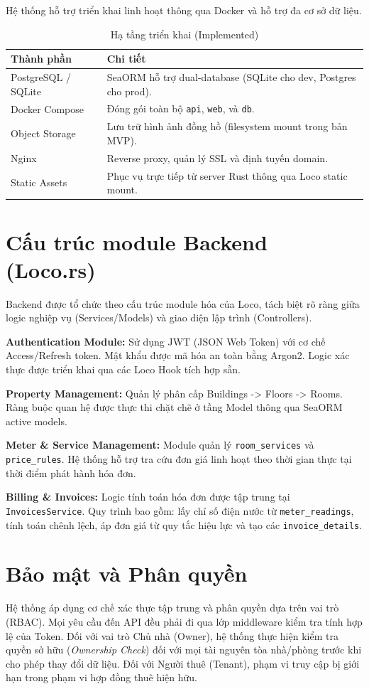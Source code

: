 Hệ thống hỗ trợ triển khai linh hoạt thông qua Docker và hỗ trợ đa cơ sở dữ liệu.

\begin{table}[htbp]
\centering
\caption{Hạ tầng triển khai (Implemented)}
\label{tab:infra}
\begin{tabularx}{\textwidth}{lX}
\toprule
\textbf{Thành phần} & \textbf{Chi tiết} \\
\midrule
PostgreSQL / SQLite & SeaORM hỗ trợ dual-database (SQLite cho dev, Postgres cho prod). \\
Docker Compose & Đóng gói toàn bộ \texttt{api}, \texttt{web}, và \texttt{db}. \\
Object Storage & Lưu trữ hình ảnh đồng hồ (filesystem mount trong bản MVP). \\
Nginx & Reverse proxy, quản lý SSL và định tuyến domain. \\
Static Assets & Phục vụ trực tiếp từ server Rust thông qua Loco static mount. \\
\bottomrule
\end{tabularx}
\end{table}

\section{Cấu trúc module Backend (Loco.rs)}

Backend được tổ chức theo cấu trúc module hóa của Loco, tách biệt rõ ràng giữa logic nghiệp vụ (Services/Models) và giao diện lập trình (Controllers).

\textbf{Authentication Module:} Sử dụng JWT (JSON Web Token) với cơ chế Access/Refresh token. Mật khẩu được mã hóa an toàn bằng Argon2. Logic xác thực được triển khai qua các Loco Hook tích hợp sẵn.

\textbf{Property Management:} Quản lý phân cấp Buildings -> Floors -> Rooms. Ràng buộc quan hệ được thực thi chặt chẽ ở tầng Model thông qua SeaORM active models.

\textbf{Meter \& Service Management:} Module quản lý \texttt{room\_services} và \texttt{price\_rules}. Hệ thống hỗ trợ tra cứu đơn giá linh hoạt theo thời gian thực tại thời điểm phát hành hóa đơn.

\textbf{Billing \& Invoices:} Logic tính toán hóa đơn được tập trung tại \texttt{InvoicesService}. Quy trình bao gồm: lấy chỉ số điện nước từ \texttt{meter\_readings}, tính toán chênh lệch, áp đơn giá từ quy tắc hiệu lực và tạo các \texttt{invoice\_details}.

\section{Bảo mật và Phân quyền}

Hệ thống áp dụng cơ chế xác thực tập trung và phân quyền dựa trên vai trò (RBAC). Mọi yêu cầu đến API đều phải đi qua lớp middleware kiểm tra tính hợp lệ của Token. Đối với vai trò Chủ nhà (Owner), hệ thống thực hiện kiểm tra quyền sở hữu (\textit{Ownership Check}) đối với mọi tài nguyên tòa nhà/phòng trước khi cho phép thay đổi dữ liệu. Đối với Người thuê (Tenant), phạm vi truy cập bị giới hạn trong phạm vi hợp đồng thuê hiện hữu.
